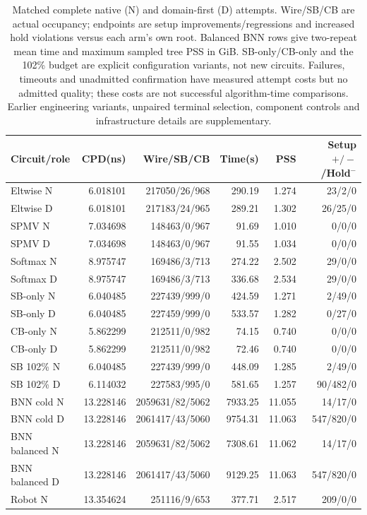 \documentclass[conference,10pt]{IEEEtran}
\begin{document}
\begin{table}[t]
\centering\footnotesize\setlength{\tabcolsep}{3pt}
\caption{Matched complete native (N) and domain-first (D) attempts. Wire/SB/CB are actual occupancy; endpoints are setup improvements/regressions and increased hold violations versus each arm's own root. Balanced BNN rows give two-repeat mean time and maximum sampled tree PSS in GiB. SB-only/CB-only and the 102\% budget are explicit configuration variants, not new circuits. Failures, timeouts and unadmitted confirmation have measured attempt costs but no admitted quality; these costs are not successful algorithm-time comparisons. Earlier engineering variants, unpaired terminal selection, component controls and infrastructure details are supplementary.}
\label{tab:completecost}
\begin{tabular}{lrrrrr}\hline
Circuit/role & CPD(ns) & Wire/SB/CB & Time(s) & PSS & Setup $+/-$/Hold$^-$\\\hline
Eltwise N&6.018101&217050/26/968&290.19&1.274&23/2/0\\
Eltwise D&6.018101&217183/24/965&289.21&1.302&26/25/0\\
SPMV N&7.034698&148463/0/967&91.69&1.010&0/0/0\\
SPMV D&7.034698&148463/0/967&91.55&1.034&0/0/0\\
Softmax N&8.975747&169486/3/713&274.22&2.502&29/0/0\\
Softmax D&8.975747&169486/3/713&336.68&2.534&29/0/0\\
SB-only N&6.040485&227439/999/0&424.59&1.271&2/49/0\\
SB-only D&6.040485&227459/999/0&533.57&1.282&0/27/0\\
CB-only N&5.862299&212511/0/982&74.15&0.740&0/0/0\\
CB-only D&5.862299&212511/0/982&72.46&0.740&0/0/0\\
SB 102\% N&6.040485&227439/999/0&448.09&1.285&2/49/0\\
SB 102\% D&6.114032&227583/995/0&581.65&1.257&90/482/0\\
BNN cold N&13.228146&2059631/82/5062&7933.25&11.055&14/17/0\\
BNN cold D&13.228146&2061417/43/5060&9754.31&11.063&547/820/0\\
BNN balanced N&13.228146&2059631/82/5062&7308.61&11.062&14/17/0\\
BNN balanced D&13.228146&2061417/43/5060&9129.25&11.063&547/820/0\\
Robot N&13.354624&251116/9/653&377.71&2.517&209/0/0\\

\end{tabular}
\end{table}
\end{document}
